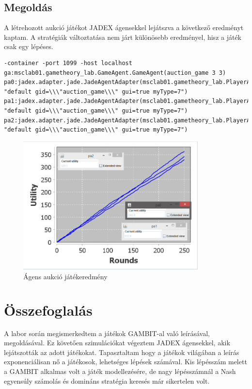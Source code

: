 \subsection{Megoldás}
A létrehozott aukció játékot JADEX ágensekkel lejátszva a következő eredményt kaptam. A stratégiák változtatása nem járt különösebb eredményel, hisz a játék csak egy lépéses.
\begin{lstlisting}[caption=Aukció run config, frame=single,float=!ht]
-container -port 1099 -host localhost 
ga:msclab01.gametheory_lab.GameAgent.GameAgent(auction_game 3 3) pa0:jadex.adapter.jade.JadeAgentAdapter(msclab01.gametheory_lab.PlayerAgent.Player 
"default gid=\\\"auction_game\\\" gui=true myType=7") 
pa1:jadex.adapter.jade.JadeAgentAdapter(msclab01.gametheory_lab.PlayerAgent.Player 
"default gid=\\\"auction_game\\\" gui=true myType=7")
pa2:jadex.adapter.jade.JadeAgentAdapter(msclab01.gametheory_lab.PlayerAgent.Player 
"default gid=\\\"auction_game\\\" gui=true myType=7")
\end{lstlisting}
\begin{figure}[!h]
\begin{center}
\includegraphics[height=7cm]{figures/auction_jadex.png}
\caption{Ágens aukció játékeredmény}
\end{center}
\end{figure}
\section{Összefoglalás}
A labor során megismerkedtem a játékok GAMBIT-al való leírásával, megoldásával. Ez követően szimulációkat végeztem JADEX ágensekkel, akik lejátszották az adott játékokat. Tapasztaltam hogy a játékok világában a leírás exponenciálisan nő a játékosok, lehetséges lépések számával. Kis lépésszám melett a GAMBIT alkalmas volt a játék modellezésére, de nagy lépésszámnál a Nash egyensúly számolás és domináns stratégia keresés már sikertelen volt.